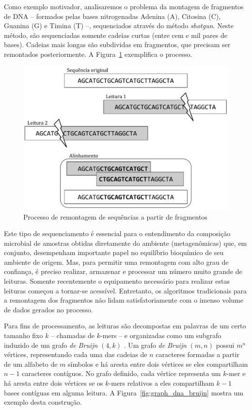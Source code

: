 Como exemplo motivador, analisaremos o problema da montagem de fragmentos de DNA -- formados pelas bases nitrogenadas Adenina (A), Citosina (C), Guanina (G) e Timina (T) --, sequenciados através do método \emph{shotgun}. Neste método, são sequenciadas somente cadeias curtas (entre cem e mil pares de bases). Cadeias mais longas são subdividas em fragmentos, que precisam ser remontados posteriormente. A Figura~\ref{fig:graph_dna_assembly} exemplifica o processo.

\begin{figure}[!htbp]
  \centering
  \includegraphics[scale=0.6]{figures/graph_dna_assembly.pdf}
  \caption{Processo de remontagem de sequências a partir de fragmentos}
  \label{fig:graph_dna_assembly}
\end{figure}

Este tipo de sequenciamento é essencial para o entendimento da composição microbial de amostras obtidas diretamente do ambiente (metagenômicas) que, em conjunto, desempenham importante papel no equilíbrio bioquímico de seu ambiente de origem. Mas, para permitir uma remontagem com alto grau de confiança, é preciso realizar, armazenar e processar um número muito grande de leituras. Somente recentemente o equipamento necessário para realizar estas leituras começou a tornar-se acessível. Entretanto, os algoritmos tradicionais para a remontagem dos fragmentos não lidam satisfatoriamente com o imenso volume de dados gerados no processo.

Para fins de processamento, as leituras são decompostas em palavras de um certo tamanho fixo $k$ -- chamadas de $k$-mers -- e organizadas como um subgrafo induzido de um grafo \emph{de Bruijn} $(4, k)$ \cite{pevzner2001eulerian,compeau2011apply}. Um grafo \emph{de Bruijn} $(m, n)$ possui $m^n$ vértices, representando cada uma das cadeias de $n$ caracteres formadas a partir de um alfabeto de $m$ símbolos e há aresta entre dois vértices se eles compartilham $n-1$ caracteres contíguos. No grafo definido, cada vértice representa um $k$-mer e há aresta entre dois vértices se os $k$-mers relativos a eles compartilham $k-1$ bases contíguas em alguma leitura. A Figura~\ref{fig:graph_dna_bruijn} mostra um exemplo desta construção. 

